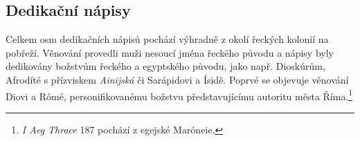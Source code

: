 
\subsection[dedikační-nápisy-7]{Dedikační nápisy}

Celkem osm dedikačních nápisů pochází výhradně z okolí řeckých kolonií na pobřeží. Věnování provedli muži nesoucí jména řeckého původu a nápisy byly dedikovány božstvům řeckého a egyptského původu, jako např. Dioskúrům, Afrodíté s přízviskem {\em Ainijská} či Sarápidovi a Ísidě. Poprvé se objevuje věnování Diovi a Rómé, personifikovanému božstvu představujícímu autoritu města Říma.\footnote{{\em I Aeg Thrace} 187 pochází z egejské Maróneie.}

